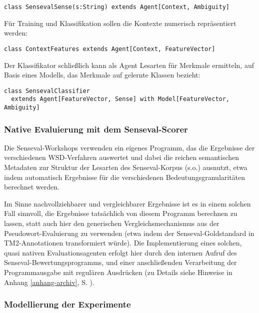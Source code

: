 \documentclass[abstracton, 12pt]{scrartcl}
\begin{document}
\begin{lstlisting}
class SensevalSense(s:String) extends Agent[Context, Ambiguity]
\end{lstlisting}

Für Training und Klassifikation sollen die Kontexte numerisch repräsentiert werden:

\begin{lstlisting}
class ContextFeatures extends Agent[Context, FeatureVector]
\end{lstlisting}

Der Klassifikator schließlich kann als Agent Lesarten für Merkmale ermitteln, auf Basis eines Modells, das Merkmale auf gelernte Klassen bezieht:

\begin{lstlisting}
class SensevalClassifier 
  extends Agent[FeatureVector, Sense] with Model[FeatureVector, Ambiguity]
\end{lstlisting}

\subsubsection{Native Evaluierung mit dem Senseval-Scorer}

Die Senseval-Workshops verwenden ein eigenes Programm, das die Ergebnisse der verschiedenen WSD-Verfahren auswertet und dabei die reichen semantischen Metadaten zur Struktur der Lesarten des Senseval-Korpus (s.o.) ausnutzt, etwa indem automatisch Ergebnisse für die verschiedenen Bedeutungsgranularitäten berechnet werden. 

Im Sinne nachvollziehbarer und vergleichbarer Ergebnisse ist es in einem solchen Fall sinnvoll, die Ergebnisse tatsächlich von diesem Programm berechnen zu lassen, statt auch hier den generischen Vergleichsmechanismus aus der Pseudowort-Evaluierung zu verwenden (etwa indem der Senseval-Goldstandard in TM2-Annotationen transformiert würde). Die Implementierung eines solchen, quasi nativen Evaluationsagenten erfolgt hier durch den internen Aufruf des Senseval-Bewertungsprogramms, und einer anschließenden Verarbeitung der Programmausgabe mit regulären Ausdrücken (zu Details siehe Hinweise in Anhang \ref{anhang-archiv}, S. \pageref{anhang-archiv}).

\subsubsection{Modellierung der Experimente} \label{appl-wsd-model}
\end{document}
